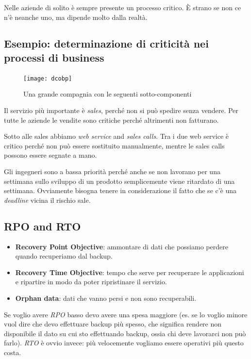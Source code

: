 Nelle aziende di solito è sempre presente un processo critico. È strano se non 
ce n'è neanche uno, ma dipende molto dalla realtà.

\subsection{Esempio: determinazione di criticità nei processi di business}

\begin{figure}[H]
 \centering
 \texttt{[image: dcobp]}
 \caption{Una grande compagnia con le seguenti sotto-componenti}
\end{figure}

Il servizio più importante è \textit{sales}, perché non si può spedire senza 
vendere. Per tutte le aziende le vendite sono critiche perché altrimenti non 
fatturano.

Sotto alle sales abbiamo \textit{web service} and \textit{sales calls}. Tra i 
due web service è critico perché non può essere sostituito manualmente, mentre 
le sales calls possono essere segnate a mano.


Gli ingegneri sono a bassa priorità perché anche se non lavorano per una 
settimana sullo sviluppo di un prodotto semplicemente viene ritardato di una 
settimana. Ovviamente bisogna tenere in considerazione il fatto che se c'è una 
\textit{deadline} vicina il rischio sale.

\subsection{RPO and RTO}

\begin{itemize}
 \item \textbf{Recovery Point Objective}: ammontare di dati che possiamo 
perdere quando recuperiamo dal backup.

 \item \textbf{Recovery Time Objective}: tempo che serve per recuperare le 
applicazioni e ripartire in modo da poter ripristinare il servizio.

 \item \textbf{Orphan data}: dati che vanno persi e non sono recuperabili.
\end{itemize}

Se voglio avere \textit{RPO} basso devo avere una spesa maggiore (es. se lo 
voglio minore vuol dire che devo effettuare backup più spesso, che significa 
rendere non disponibile il dato su cui sto effettuando backup, ossia chi deve 
lavorarci non può farlo).
\textit{RTO} è ovvio invece: più velocemente vogliamo essere operativi più 
questo costa.

